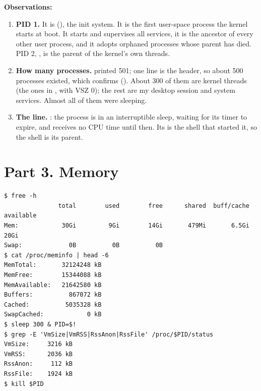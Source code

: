 \documentclass[11pt,a4paper]{article}
\begin{document}
\textbf{Observations:}
\begin{enumerate}
  \item \textbf{PID 1.} It is  (), the init
  system. It is the first user-space process the kernel starts at boot. It starts and
  supervises all services, it is the ancestor of every other user process, and it adopts
  orphaned processes whose parent has died. PID 2, , is the parent of the
  kernel's own threads.
  \item \textbf{How many processes.}  printed 501; one line is the header,
  so about 500 processes existed, which  confirms (). About
  300 of them are kernel threads (the ones in \code{[brackets]}, with VSZ 0); the rest are my
  desktop session and system services. Almost all of them were sleeping.
  \item \textbf{The  line.} : the process is in an
  interruptible sleep, waiting for its timer to expire, and receives no CPU time until then.
  Its  is the shell that started it, so the shell is its parent.
\end{enumerate}

\section{Part 3. Memory}

\begin{lstlisting}
$ free -h
               total        used        free      shared  buff/cache   available
Mem:            30Gi         9Gi        14Gi       479Mi       6.5Gi        20Gi
Swap:             0B          0B          0B
$ cat /proc/meminfo | head -6
MemTotal:       32124248 kB
MemFree:        15344088 kB
MemAvailable:   21642580 kB
Buffers:          867072 kB
Cached:          5035328 kB
SwapCached:            0 kB
$ sleep 300 & PID=$!
$ grep -E 'VmSize|VmRSS|RssAnon|RssFile' /proc/$PID/status
VmSize:     3216 kB
VmRSS:      2036 kB
RssAnon:     112 kB
RssFile:    1924 kB
$ kill $PID
\end{lstlisting}
\end{document}
